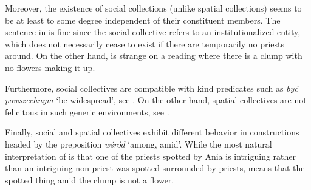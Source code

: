 \documentclass[output=paper]{langscibook}
\begin{document}
\noindent Moreover, the existence of social collections (unlike spatial collections) seems to be at least to some degree independent of their constituent members. The sentence in  is fine since the social collective refers to an institutionalized entity, which does not necessarily cease to exist if there are temporarily no priests around. On the other hand,  is strange on a reading where there is a clump with no flowers making it up. 

\ea\judgewidth{\#}\label{wan:ex:no}
\label{wan:ex:social-no}
\label{wan:ex:spatial-no}
\z
\z

\noindent Furthermore, social collectives are compatible with kind predicates such as \textit{być powszechnym} `be widespread', see . On the other hand, spatial collectives are not felicitous in such generic environments, see .

\ea\judgewidth{\#}\label{wan:ex:generic}
\label{wan:ex:generic-social}
\label{wan:ex:generic-spatial}
\z
\z

\noindent Finally, social and spatial collectives exhibit different behavior in constructions headed by the preposition \textit{wśród} `among, amid'. While the most natural interpretation of  is that one of the priests spotted by Ania is intriguing rather than an intriguing non-priest was spotted surrounded by priests,  means that the spotted thing amid the clump is not a flower.
\end{document}
